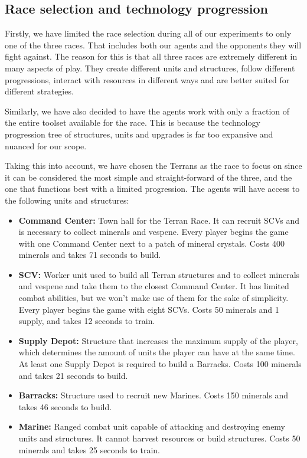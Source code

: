 \subsection{Race selection and technology progression}

Firstly, we have limited the race selection during all of our experiments to only one of the three races. That includes both our agents and the opponents they will fight against. The reason for this is that all three races are extremely different in many aspects of play. They create different units and structures, follow different progressions, interact with resources in different ways and are better suited for different strategies.

Similarly, we have also decided to have the agents work with only a fraction of the entire toolset available for the race. This is because the technology progression tree of structures, units and upgrades is far too expansive and nuanced for our scope.

Taking this into account, we have chosen the Terrans as the race to focus on since it can be considered the most simple and straight-forward of the three, and the one that functions best with a limited progression. The agents will have access to the following units and structures:

\begin{itemize}
    \item \textbf{Command Center:} Town hall for the Terran Race. It can recruit SCVs and is necessary to collect minerals and vespene. Every player begins the game with one Command Center next to a patch of mineral crystals. Costs 400 minerals and takes 71 seconds to build.
    \item \textbf{SCV:} Worker unit used to build all Terran structures and to collect minerals and vespene and take them to the closest Command Center. It has limited combat abilities, but we won't make use of them for the sake of simplicity. Every player begins the game with eight SCVs. Costs 50 minerals and 1 supply, and takes 12 seconds to train.
    \item \textbf{Supply Depot:} Structure that increases the maximum supply of the player, which determines the amount of units the player can have at the same time. At least one Supply Depot is required to build a Barracks. Costs 100 minerals and takes 21 seconds to build.
    \item \textbf{Barracks:} Structure used to recruit new Marines. Costs 150 minerals and takes 46 seconds to build.
    \item \textbf{Marine:} Ranged combat unit capable of attacking and destroying enemy units and structures. It cannot harvest resources or build structures. Costs 50 minerals and takes 25 seconds to train.
\end{itemize}

